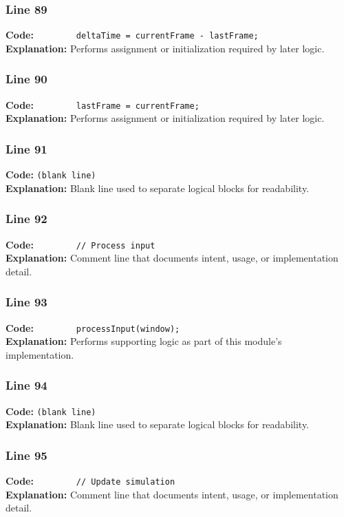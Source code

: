 \documentclass[11pt,a4paper]{article}
\begin{document}
\subsubsection*{Line 89}
\textbf{Code:} \verb|        deltaTime = currentFrame - lastFrame;|\\
\textbf{Explanation:} Performs assignment or initialization required by later logic.

\subsubsection*{Line 90}
\textbf{Code:} \verb|        lastFrame = currentFrame;|\\
\textbf{Explanation:} Performs assignment or initialization required by later logic.

\subsubsection*{Line 91}
\textbf{Code:} \texttt{(blank line)}\\
\textbf{Explanation:} Blank line used to separate logical blocks for readability.

\subsubsection*{Line 92}
\textbf{Code:} \verb|        // Process input|\\
\textbf{Explanation:} Comment line that documents intent, usage, or implementation detail.

\subsubsection*{Line 93}
\textbf{Code:} \verb|        processInput(window);|\\
\textbf{Explanation:} Performs supporting logic as part of this module's implementation.

\subsubsection*{Line 94}
\textbf{Code:} \texttt{(blank line)}\\
\textbf{Explanation:} Blank line used to separate logical blocks for readability.

\subsubsection*{Line 95}
\textbf{Code:} \verb|        // Update simulation|\\
\textbf{Explanation:} Comment line that documents intent, usage, or implementation detail.
\end{document}

